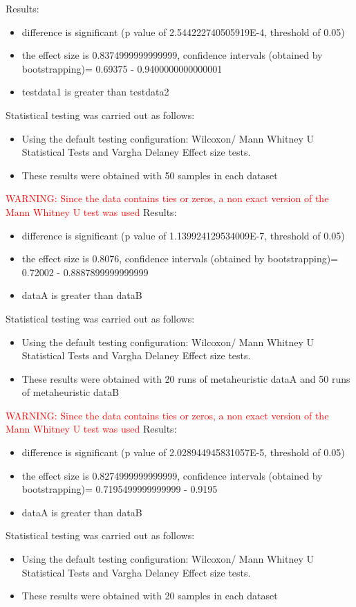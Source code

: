 \documentclass[]{article}
\begin{document}
Results:
\begin{itemize}
\item{difference is significant (p value of 2.544222740505919E-4, threshold of 0.05)}
\item{the effect size is 0.8374999999999999, confidence intervals (obtained by bootstrapping)= 0.69375 - 0.9400000000000001}
\item{testdata1 is greater than testdata2}
\end{itemize}Statistical testing was carried out as follows: \begin{itemize}
\item{Using the default testing configuration: Wilcoxon/ Mann Whitney U Statistical Tests and Vargha Delaney Effect size tests.}
\item{These results were obtained with 50 samples in each dataset}
\end{itemize}
\textcolor{Red}{WARNING: Since the data contains ties or zeros, a non exact version of the Mann Whitney U test was used
}
Results:
\begin{itemize}
\item{difference is significant (p value of 1.139924129534009E-7, threshold of 0.05)}
\item{the effect size is 0.8076, confidence intervals (obtained by bootstrapping)= 0.72002 - 0.8887899999999999}
\item{dataA is greater than dataB}
\end{itemize}Statistical testing was carried out as follows: \begin{itemize}
\item{Using the default testing configuration: Wilcoxon/ Mann Whitney U Statistical Tests and Vargha Delaney Effect size tests.}
\item{These results were obtained with 20 runs of metaheuristic dataA and 50 runs of metaheuristic dataB}
\end{itemize}
\textcolor{Red}{WARNING: Since the data contains ties or zeros, a non exact version of the Mann Whitney U test was used
}
Results:
\begin{itemize}
\item{difference is significant (p value of 2.028944945831057E-5, threshold of 0.05)}
\item{the effect size is 0.8274999999999999, confidence intervals (obtained by bootstrapping)= 0.7195499999999999 - 0.9195}
\item{dataA is greater than dataB}
\end{itemize}Statistical testing was carried out as follows: \begin{itemize}
\item{Using the default testing configuration: Wilcoxon/ Mann Whitney U Statistical Tests and Vargha Delaney Effect size tests.}
\item{These results were obtained with 20 samples in each dataset}
\end{itemize}
\end{document}
